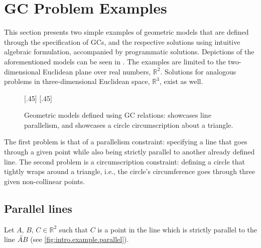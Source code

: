 \section{\acl{GC} Problem Examples}%
\label{sec:intro.examples}

This section presents two simple examples of geometric models that are defined
through the specification of \acp{GC}, and the respective solutions using
intuitive algebraic formulation, accompanied by programmatic solutions.
Depictions of the aforementioned models can be seen in .
The examples are limited to the two-dimensional Euclidean plane over real
numbers, $\mathbb{R}^2$.  Solutions for analogous problems in three-dimensional
Euclidean space, $\mathbb{R}^3$, exist as well.

\begin{figure}[htpb]
    [.45\linewidth]{\resizebox{!}{.2\textheight}{}}
  \hspace{\fill}
    [.45\linewidth]{\resizebox{!}{.2\textheight}{}}
  \caption[Geometric models defined using GCs]{
    Geometric models defined using \ac{GC} relations:
     showcases line parallelism, and
     showcases a circle circumscription
    about a triangle.}\label{fig:intro.example}
\end{figure}

The first problem is that of a parallelism constraint: specifying a line that
goes through a given point while also being strictly parallel to another already
defined line.  The second problem is a circumscription constraint: defining a
circle that tightly wraps around a triangle, i.e., the circle's circumference
goes through three given non-collinear points.

\subsection{Parallel lines}%
\label{sec:intro.examples.parallel}

Let $A,\,B,\,C \in \mathbb{R}^2$ such that $C$ is a point in the line which is
strictly parallel to the line $\overleftrightarrow{AB}$ (see
\cref{fig:intro.example.parallel}).

